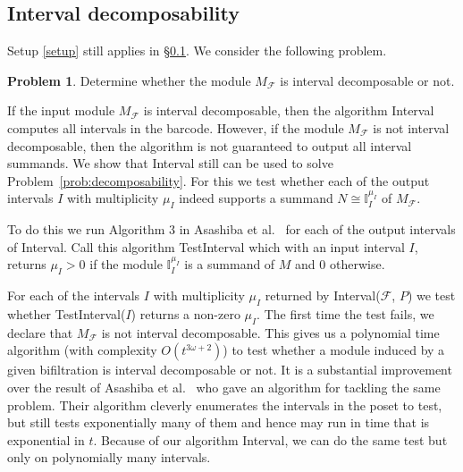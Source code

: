 \documentclass[11pt]{article}
\theoremstyle{definition}
\newtheorem{problem}[theorem]{Problem}
\newcommand{\I}{\mathbb{I}}
\newcommand{\Pb}{P}
\newcommand{\NN}{t}
\begin{document}
\subsection{Interval decomposability}\label{sec:Interval decomposability}
Setup \ref{setup} still applies in \S\ref{sec:Interval decomposability}. We consider the following problem.
\begin{problem}\label{prob:interval decomposability}
Determine whether the module $M_{\mathcal F}$ is interval decomposable or not.
\label{prob:decomposability}
\end{problem}

If the input module $M_{\mathcal F}$ is interval decomposable, then the algorithm {\sc Interval} computes all intervals in the barcode. However, if the module $M_{\mathcal F}$ is not interval decomposable, then the algorithm is not guaranteed to output all interval summands.
We show that {\sc Interval} still can be used to solve Problem~\ref{prob:decomposability}.
For this we test whether each of the output intervals $I$ with
multiplicity $\mu_I$ indeed supports a summand $N\cong \I_I^{\mu_I}$ of $M_{\mathcal F}$. 

To do this we run  Algorithm 3 in Asashiba et al.~\cite{asashiba2018interval} for each of the output intervals of {\sc Interval}. Call this algorithm {\sc TestInterval} which with
an input interval $I$, returns $\mu_I>0$ if the module $\I_I^{\mu_I}$ is a summand
of $M$ and $0$ otherwise. 

For each of the intervals $I$ with multiplicity $\mu_I$ returned by {\sc Interval}($\mathcal F$, $\Pb$)
we test whether {\sc TestInterval}($I$) returns a non-zero $\mu_I$.
The first time the test fails, we declare that $M_{\mathcal F}$ is not interval decomposable. 
This gives us a polynomial time algorithm (with complexity $O(\NN^{3\omega+2})$)
to test whether a module induced by a given bifiltration is interval decomposable or not.
It is a substantial improvement over the result of Asashiba et al.~\cite{asashiba2018interval} who gave an algorithm for tackling the same problem. Their algorithm cleverly enumerates  the 
intervals in the poset to test, but still tests exponentially many of them and hence may run in time that is exponential in $\NN$. Because of our algorithm {\sc Interval},
we can do the same test but only on polynomially many intervals. \\
\end{document}
